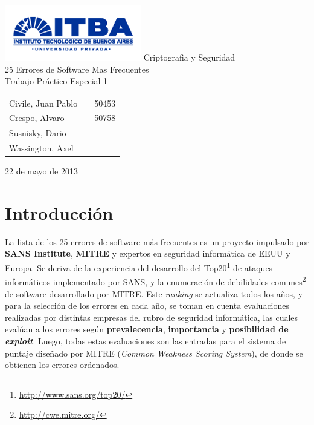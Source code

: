 \documentclass[a4paper,10pt]{article}
\begin{document}
\setcounter{secnumdepth}{5}
\setcounter{tocdepth}{5}

\begin{titlepage}
        \vfill
        \thispagestyle{empty}
        \begin{center}
                \includegraphics{./images/itba_logo.png}
                \vfill
                \Huge{Criptografia y Seguridad}\\
                \vspace{1cm}
                \Huge{25 Errores de Software Mas Frecuentes}\\
                \vspace{1cm}
                \Huge{Trabajo Pr\'actico Especial 1}\\
        \end{center}
        \vfill
        \large{
        \begin{tabular}{lcr}
                Civile, Juan Pablo && 50453\\
                Crespo, Alvaro && 50758 \\
                Susnisky, Dario && \\
                Wassington, Axel && \\
        \end{tabular}
}
        \vspace{2cm}
        \begin{center}
                \large{22 de mayo de 2013}\\
        \end{center}
\end{titlepage}
\newpage

\setcounter{page}{1}

\section{Introducción}
La lista de los 25 errores de software más frecuentes es un proyecto impulsado por \textbf{SANS Institute}, \textbf{MITRE} y expertos en seguridad informática de EEUU 
y Europa. Se deriva de la experiencia del desarrollo del Top20\footnote{\href{http://www.sans.org/top20/}{http://www.sans.org/top20/}} de ataques informáticos
implementado por SANS, y la enumeración de debilidades comunes\footnote{\href{http://cwe.mitre.org/}{http://cwe.mitre.org/}} de software 
desarrollado por MITRE. Este \emph{ranking} se actualiza todos los años, y para la selección de los errores en cada año,
se toman en cuenta evaluaciones realizadas por distintas empresas del rubro de seguridad informática, las cuales evalúan a
los errores según \textbf{prevalecencia}, \textbf{importancia} y \textbf{posibilidad de \emph{exploit}}. Luego, todas estas
evaluaciones son las entradas para el sistema de puntaje diseñado por MITRE (\emph{Common Weakness Scoring System}), de donde se obtienen los
errores ordenados.\\
 
\end{document}
